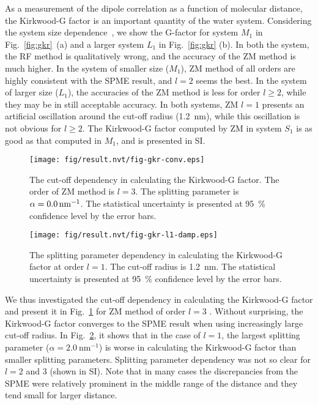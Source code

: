 \documentclass[a4paper,preprint,unsortedaddress,onecolumn,fleqn]{revtex4}
\begin{document}
As a measurement of the dipole correlation as a function of molecular
distance, the Kirkwood-G factor is an important quantity of the water
system. Considering the system size dependence~\cite{vanderSpoel2006origin},
we show the G-factor for system $M_{1}$ in Fig.~\ref{fig:gkr}~(a) and a
larger system $L_{1}$ in Fig.~\ref{fig:gkr} (b). In both the system, the RF
method is qualitatively wrong, and the accuracy of the ZM method is much
higher. In the system of smaller size ($M_{1}$), ZM method of all orders are
highly consistent with the SPME result, and $l=2$ seems the best. In the
system of larger size ($L_{1}$), the accuracies of the ZM method is less for
order $l\geq 2$, while they may be in still acceptable accuracy. In both
systems, ZM $l=1$ presents an artificial oscillation around the cut-off
radius (1.2~nm), while this oscillation is not obvious for $l\geq 2$. 
The Kirkwood-G factor computed by ZM in system $S_{1}$ is as
good as that computed in $M_{1}$, and is presented in SI.

\begin{figure}[tbp]
\centering
\texttt{[image: fig/result.nvt/fig-gkr-conv.eps]}
\caption{ The cut-off dependency in calculating the Kirkwood-G factor. The
order of ZM method is $l=3$. The splitting parameter is $\protect\alpha %
=0.0\,\text{nm}^{-1}$. The statistical uncertainty is presented at 95~\%
confidence level by the error bars. }
\label{fig:gkr-conv}
\end{figure}

\begin{figure}[tbp]
\centering
\texttt{[image: fig/result.nvt/fig-gkr-l1-damp.eps]}
\caption{ The splitting parameter dependency in calculating the Kirkwood-G
factor at order $l=1$. The cut-off radius is 1.2~nm. The statistical
uncertainty is presented at 95~\% confidence level by the error bars. }
\label{fig:gkr-damp-l1}
\end{figure}

We thus investigated the cut-off dependency in calculating the Kirkwood-G
factor and present it in Fig.~\ref{fig:gkr-conv} for ZM method of order $l=3$%
. Without surprising, the Kirkwood-G factor converges to the SPME result
when using increasingly large cut-off radius. In Fig.~\ref{fig:gkr-damp-l1},
it shows that in the case of $l=1$, the largest splitting parameter ($\alpha
=2.0\ \text{nm}^{-1}$) is worse in calculating the Kirkwood-G factor than
smaller splitting parameters. Splitting parameter dependency was not so
clear for $l=2$ and 3 (shown in SI). Note that in many cases the
discrepancies from the SPME were relatively prominent in the middle range of
the distance and they tend small for larger distance.
\end{document}
